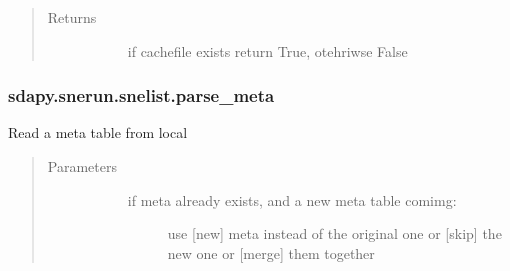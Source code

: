 \documentclass[letterpaper,10pt,english]{sphinxmanual}
\begin{document}
\begin{fulllineitems}
\begin{fulllineitems}
\begin{quote}
\begin{description}
\begin{description}
\end{description}

\item[{Returns}] \leavevmode\begin{description}
\item[{}] \leavevmode{[}\sphinxtitleref{bool}{]}
if cachefile exists return True, otehriwse False

\end{description}

\end{description}\end{quote}



\begin{description}
\item[{{\hyperref[\detokenize{generated/sdapy.snerun.snelist.save_data:sdapy.snerun.snelist.save_data}]{}}}] \leavevmode
\end{description}



\end{fulllineitems}



\subsubsection{sdapy.snerun.snelist.parse\_meta}
\label{\detokenize{generated/sdapy.snerun.snelist.parse_meta:sdapy-snerun-snelist-parse-meta}}\label{\detokenize{generated/sdapy.snerun.snelist.parse_meta::doc}}

\begin{fulllineitems}
\label{\detokenize{generated/sdapy.snerun.snelist.parse_meta:sdapy.snerun.snelist.parse_meta}}
Read a meta table from local
\begin{quote}\begin{description}
\item[{Parameters}] \leavevmode\begin{description}
\item[{}] \leavevmode{[}\sphinxtitleref{bool}{]}\begin{description}
\item[{if meta already exists, and a new meta table comimg:}] \leavevmode
use {[}new{]} meta instead of the original one
or {[}skip{]} the new one 
or {[}merge{]} them together


\end{description}
\end{description}
\end{description}
\end{quote}
\end{fulllineitems}
\end{fulllineitems}
\end{document}
